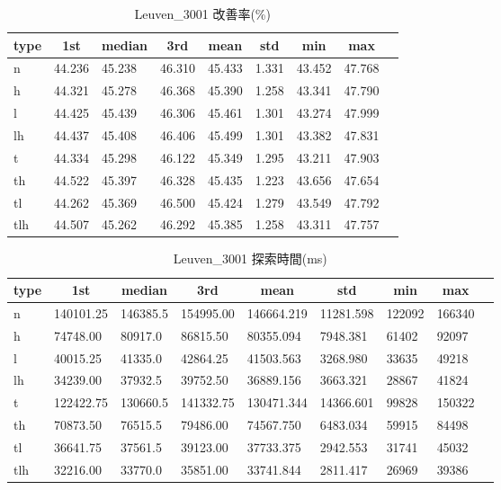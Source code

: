\begin{table}[htbp]
    \centering
    \caption{Leuven\_3001 改善率(\%)}
    \begin{tabular}{|l|l|l|l|l|l|l|l|l|}\hline
    \multicolumn{1}{|c|}{\textbf{type}}
    &\multicolumn{1}{|c|}{\textbf{1st}}
    &\multicolumn{1}{c|}{\textbf{median}}
    &\multicolumn{1}{c|}{\textbf{3rd}}
    &\multicolumn{1}{c|}{\textbf{mean}}
    &\multicolumn{1}{c|}{\textbf{std}}
    &\multicolumn{1}{c|}{\textbf{min}}
    &\multicolumn{1}{c|}{\textbf{max}}\\\hline
	n & 44.236 & 45.238 & 46.310 & 45.433 & 1.331 & 43.452 & 47.768\\\hline
	h & 44.321 & 45.278 & 46.368 & 45.390 & 1.258 & 43.341 & 47.790\\\hline
	l & 44.425 & 45.439 & 46.306 & 45.461 & 1.301 & 43.274 & 47.999\\\hline
	lh & 44.437 & 45.408 & 46.406 & 45.499 & 1.301 & 43.382 & 47.831\\\hline
	t & 44.334 & 45.298 & 46.122 & 45.349 & 1.295 & 43.211 & 47.903\\\hline
	th & 44.522 & 45.397 & 46.328 & 45.435 & 1.223 & 43.656 & 47.654\\\hline
	tl & 44.262 & 45.369 & 46.500 & 45.424 & 1.279 & 43.549 & 47.792\\\hline
	tlh & 44.507 & 45.262 & 46.292 & 45.385 & 1.258 & 43.311 & 47.757\\\hline
	\end{tabular}
\end{table}
\begin{table}[htbp]
    \centering
    \caption{Leuven\_3001 探索時間(ms)}
    \begin{tabular}{|l|l|l|l|l|l|l|l|l|}\hline
    \multicolumn{1}{|c|}{\textbf{type}}
    &\multicolumn{1}{|c|}{\textbf{1st}}
    &\multicolumn{1}{c|}{\textbf{median}}
    &\multicolumn{1}{c|}{\textbf{3rd}}
    &\multicolumn{1}{c|}{\textbf{mean}}
    &\multicolumn{1}{c|}{\textbf{std}}
    &\multicolumn{1}{c|}{\textbf{min}}
    &\multicolumn{1}{c|}{\textbf{max}}\\\hline
	n & 140101.25 & 146385.5 & 154995.00 & 146664.219 & 11281.598 & 122092 & 166340\\\hline
	h & 74748.00 & 80917.0 & 86815.50 & 80355.094 & 7948.381 & 61402 & 92097\\\hline
	l & 40015.25 & 41335.0 & 42864.25 & 41503.563 & 3268.980 & 33635 & 49218\\\hline
	lh & 34239.00 & 37932.5 & 39752.50 & 36889.156 & 3663.321 & 28867 & 41824\\\hline
	t & 122422.75 & 130660.5 & 141332.75 & 130471.344 & 14366.601 & 99828 & 150322\\\hline
	th & 70873.50 & 76515.5 & 79486.00 & 74567.750 & 6483.034 & 59915 & 84498\\\hline
	tl & 36641.75 & 37561.5 & 39123.00 & 37733.375 & 2942.553 & 31741 & 45032\\\hline
	tlh & 32216.00 & 33770.0 & 35851.00 & 33741.844 & 2811.417 & 26969 & 39386\\\hline
	\end{tabular}
\end{table}
